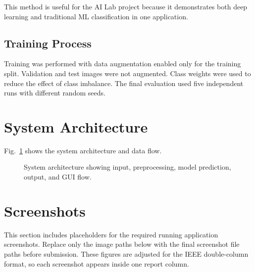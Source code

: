 \documentclass[conference]{IEEEtran}
\begin{document}
This method is useful for the AI Lab project because it demonstrates both deep learning and traditional ML classification in one application.

\subsection{Training Process}
Training was performed with data augmentation enabled only for the training split. Validation and test images were not augmented. Class weights were used to reduce the effect of class imbalance. The final evaluation used five independent runs with different random seeds.

\section{System Architecture}
Fig.~\ref{fig:architecture} shows the system architecture and data flow.

\begin{figure}[h]
\centering
{}
\caption{System architecture showing input, preprocessing, model prediction, output, and GUI flow.}
\label{fig:architecture}
\end{figure}

\section{Screenshots}
This section includes placeholders for the required running application screenshots. Replace only the image paths below with the final screenshot file paths before submission. These figures are adjusted for the IEEE double-column format, so each screenshot appears inside one report column.
\end{document}

